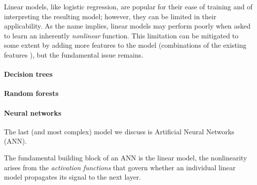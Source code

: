 
Linear models, like logistic regression, are popular for their ease of
training and of interpreting the resulting model; however, they can be
limited in their applicability.
%
As the name implies, linear models may perform poorly when asked to
learn an inherently \emph{nonlinear} function.
%
This limitation can be mitigated to some extent by adding more features
to the model (\eg combinations of the existing features ), but
the fundamental issue remains.

\paragraph{Decision trees}

\paragraph{Random forests}

\paragraph{Neural networks}
The last (and most complex) model we discuss is Artificial Neural
Networks (ANN).

The fundamental building block of an ANN is the linear model, the
nonlinearity arises from the \emph{activation functions} that govern
whether an individual linear model propagates its signal to the next layer.





